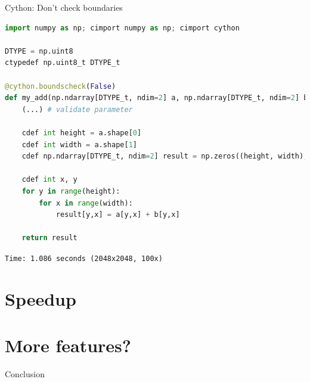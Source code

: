 \documentclass[dvipsnames]{beamer}
\begin{document}
\begin{frame}[fragile]{Cython: Don't check boundaries}
\begin{lstlisting}[language=Python,caption={add5.pyx}]
import numpy as np; cimport numpy as np; cimport cython

DTYPE = np.uint8
ctypedef np.uint8_t DTYPE_t

@cython.boundscheck(False)
def my_add(np.ndarray[DTYPE_t, ndim=2] a, np.ndarray[DTYPE_t, ndim=2] b):
    (...) # validate parameter

    cdef int height = a.shape[0]
    cdef int width = a.shape[1]
    cdef np.ndarray[DTYPE_t, ndim=2] result = np.zeros((height, width), dtype=DTYPE)

    cdef int x, y
    for y in range(height):
        for x in range(width):
            result[y,x] = a[y,x] + b[y,x]

    return result
\end{lstlisting}
\pause
\vspace{-0.3cm}
{\tt Time: 1.086 seconds (2048x2048, 100x)}
\end{frame}

\section{Speedup}

\section{More features?}

\begin{frame}{Conclusion}


\end{frame}
\end{document}
